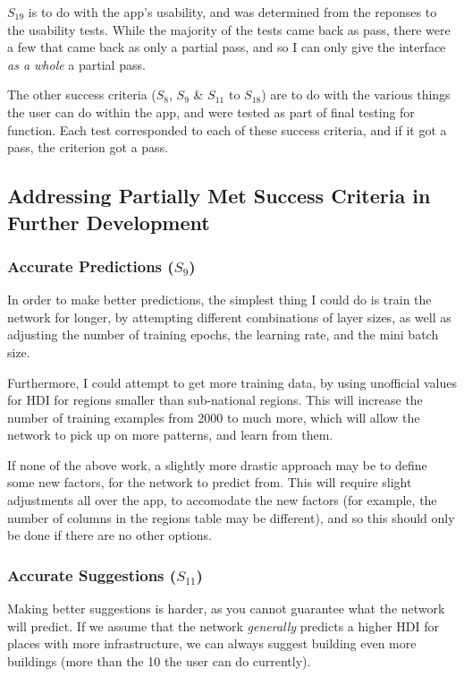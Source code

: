 \documentclass[12pt]{report}
\begin{document}
$S_{19}$ is to do with the app's usability, and was determined from the reponses to the usability tests. While the majority of the tests came back as pass, there were a few that came back as only a partial pass, and so I can only give the interface \textit{as a whole} a partial pass.

The other success criteria ($S_{8}$, $S_{9}$ \& $S_{11}$ to $S_{18}$) are to do with the various things the user can do within the app, and were tested as part of final testing for function. Each test corresponded to each of these success criteria, and if it got a pass, the criterion got a pass.

\subsection{Addressing Partially Met Success Criteria in Further Development}
\subsubsection{Accurate Predictions ($S_{9}$)}
In order to make better predictions, the simplest thing I could do is train the network for longer, by attempting different combinations of layer sizes, as well as adjusting the number of training epochs, the learning rate, and the mini batch size.

Furthermore, I could attempt to get more training data, by using unofficial values for HDI for regions smaller than sub-national regions. This will increase the number of training examples from 2000 to much more, which will allow the network to pick up on more patterns, and learn from them.

If none of the above work, a slightly more drastic approach may be to define some new factors, for the network to predict from. This will require slight adjustments all over the app, to accomodate the new factors (for example, the number of columns in the regions table may be different), and so this should only be done if there are no other options.

\subsubsection{Accurate Suggestions ($S_{11}$)}
Making better suggestions is harder, as you cannot guarantee what the network will predict. If we assume that the network \textit{generally} predicts a higher HDI for places with more infrastructure, we can always suggest building even more buildings (more than the 10 the user can do currently).
\end{document}

